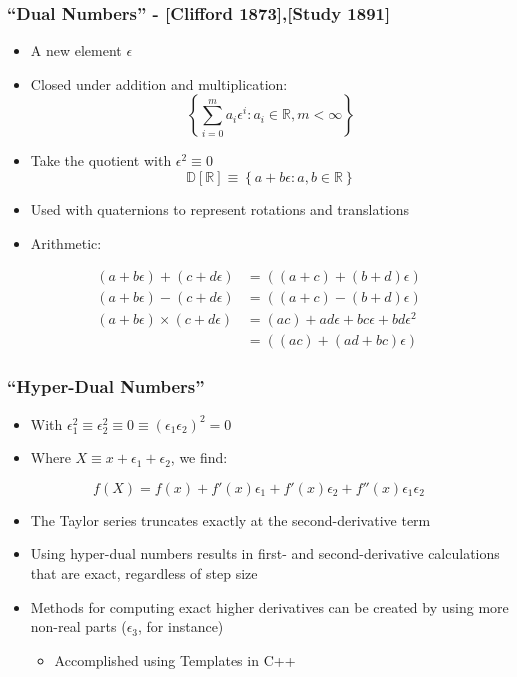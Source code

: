 \documentclass[mathserif]{beamer}
\newcommand{\Reals}{{\ensuremath{\mathbb{R}}}}
\newcommand{\Duals}{{\ensuremath{\mathbb{D}}}}
\begin{document}
\begin{frame}
\frametitle{``Dual Numbers'' - [Clifford 1873],[Study 1891]} 

\begin{itemize}
\item A new element $\epsilon$
\item Closed under addition and multiplication:
\[\left\{\sum_{i=0}^{m} a_i \epsilon^i: a_i \in \Reals, m < \infty\right\}\]
\item Take the quotient with $\epsilon^2 \equiv 0$
\[\Duals[\Reals] \equiv \left\{a + b \epsilon: a,b \in \Reals\right\}\]
\item Used with quaternions to represent rotations and translations
\item Arithmetic:
\end{itemize}
\begin{align*}
(a+b\epsilon) + (c+d\epsilon) &= ((a+c) + (b+d)\epsilon) \\
(a+b\epsilon) - (c+d\epsilon) &= ((a+c) - (b+d)\epsilon) \\
(a+b\epsilon) \times (c+d\epsilon) &= (ac) + ad\epsilon + bc\epsilon + bd\epsilon^2 \\
                              &= ((ac) + (ad+bc)\epsilon)
\end{align*}
\end{frame}

\begin{frame}
\frametitle{``Hyper-Dual Numbers''}
 \begin{itemize}
  \item With $\epsilon_1^2 \equiv \epsilon_2^2 \equiv 0 \equiv (\epsilon_1
	\epsilon_2)^2 = 0$
	
  \item Where $X \equiv x + \epsilon_1 + \epsilon_2$, we find:
 \end{itemize}
 \[ f(X) = f(x) + f'(x) \epsilon_1 + f'(x) \epsilon_2 + f''(x) \epsilon_1 \epsilon_2 \]

 \begin{itemize}
  \item The Taylor series truncates exactly at the second-derivative term
  \item Using hyper-dual numbers results in first- and second-derivative
	calculations that are exact, regardless of step size
  \item Methods for computing exact higher derivatives can be created by
	using more non-real parts ($\epsilon_3$, for instance)
  \begin{itemize}
   \item Accomplished using Templates in C++
  \end{itemize}
 \end{itemize}
\end{frame}
\end{document}
